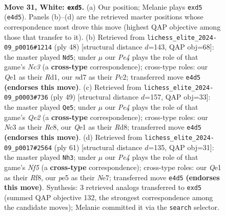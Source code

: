 \documentclass[11pt]{article}
\begin{document}
\clearpage

\begin{figure}[p]\centering
\begin{subfigure}{0.46\textwidth}\centering
\resizebox{\linewidth}{!}{%
\newchessgame
\chessboard[
  setfen={3r2k1/3nq1p1/rp2pn2/3pp2p/P3P3/2N2NP1/2P2P1P/R1R1Q1K1 w - - 0 31},
  showmover=false,
  pgfstyle=straightmove, color=movearrow, markmove={e4-d5}
]}
\caption{}
\end{subfigure}\hfill
\begin{subfigure}{0.46\textwidth}\centering
\resizebox{\linewidth}{!}{%
\newchessgame
\chessboard[
  setfen={2rrnk2/1q3ppp/p2pn3/1p4P1/4P1R1/P1N5/1PP1Q1BP/3R2K1 w - - 3 25},
  showmover=false,
  pgfstyle=straightmove, color=movearrow, markmove={c3-d5}
]}
\caption{}
\end{subfigure}
\\[4pt]
\begin{subfigure}{0.46\textwidth}\centering
\resizebox{\linewidth}{!}{%
\newchessgame
\chessboard[
  setfen={2rr4/pp2q1kp/3n1pp1/P1pP4/1nP1NRP1/2Q1P3/3N3P/R5K1 b - - 0 25},
  showmover=false,
  pgfstyle=straightmove, color=movearrow, markmove={e7-e5}
]}
\caption{}
\end{subfigure}\hfill
\begin{subfigure}{0.46\textwidth}\centering
\resizebox{\linewidth}{!}{%
\newchessgame
\chessboard[
  setfen={5r2/1p2nrpk/1Pppp1qp/8/3PPn1P/1Q2RNP1/2R2P1N/7K b - - 2 31},
  showmover=false,
  pgfstyle=straightmove, color=movearrow, markmove={f4-h3}
]}
\caption{}
\end{subfigure}
\caption{\textbf{Move 31, White: \texttt{exd5}.} (a) Our position; Melanie plays \texttt{exd5} (\texttt{e4d5}). Panels (b)--(d) are the retrieved master positions whose correspondence most drove this move (highest QAP objective among those that transfer to it). (b) Retrieved from \texttt{lichess\_elite\_2024-09\_p0016\#1214} (ply 48) [structural distance $d$=143, QAP obj=68]: the master played \texttt{Nd5}; under $\mu$ our \emph{Pe4} plays the role of that game's \emph{Nc3} (a \textbf{cross-type} correspondence); cross-type roles: our \emph{Q}e1 as their \emph{R}d1, our \emph{n}d7 as their \emph{P}c2; transferred move \texttt{e4d5} \textbf{(endorses this move)}. (c) Retrieved from \texttt{lichess\_elite\_2024-09\_p0003\#736} (ply 49) [structural distance $d$=157, QAP obj=33]: the master played \texttt{Qe5}; under $\mu$ our \emph{Pe4} plays the role of that game's \emph{Qe2} (a \textbf{cross-type} correspondence); cross-type roles: our \emph{N}c3 as their \emph{R}c8, our \emph{Q}e1 as their \emph{R}d8; transferred move \texttt{e4d5} \textbf{(endorses this move)}. (d) Retrieved from \texttt{lichess\_elite\_2024-09\_p0017\#2564} (ply 61) [structural distance $d$=135, QAP obj=31]: the master played \texttt{Nh3}; under $\mu$ our \emph{Pe4} plays the role of that game's \emph{Nf5} (a \textbf{cross-type} correspondence); cross-type roles: our \emph{Q}e1 as their \emph{R}f8, our \emph{p}e5 as their \emph{N}e7; transferred move \texttt{e4d5} \textbf{(endorses this move)}. Synthesis: 3 retrieved analogs transferred to \texttt{exd5} (summed QAP objective 132, the strongest correspondence among the candidate moves); Melanie committed it via the \texttt{search} selector.}

\end{figure}
\end{document}
